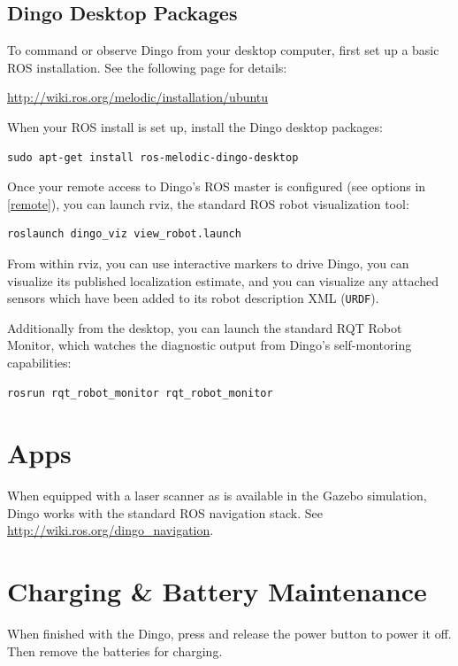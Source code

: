 \documentclass[]{clearpath-latex/clearpath-manual}
\begin{document}
\newpage\subsection{Dingo Desktop Packages}

To command or observe Dingo from your desktop computer, first set up a basic
ROS installation. See the following page for details:

\url{http://wiki.ros.org/melodic/installation/ubuntu}

When your ROS install is set up, install the Dingo desktop packages:

\begin{lstlisting}
sudo apt-get install ros-melodic-dingo-desktop
\end{lstlisting}

Once your remote access to Dingo's ROS master is configured (see options in \autoref{remote}),
you can launch rviz, the standard ROS robot visualization tool:

\begin{lstlisting}
roslaunch dingo_viz view_robot.launch
\end{lstlisting}

From within rviz, you can use interactive markers to drive Dingo, you can visualize its
published localization estimate, and you can visualize any attached sensors which have been
added to its robot description XML (\lstinline{URDF}).

Additionally from the desktop, you can launch the standard RQT Robot Monitor, which
watches the diagnostic output from Dingo's self-montoring capabilities:

\begin{lstlisting}
rosrun rqt_robot_monitor rqt_robot_monitor
\end{lstlisting}

\section{Apps}

When equipped with a laser scanner as is available in the Gazebo simulation, Dingo works with the
standard ROS navigation stack. See \url{http://wiki.ros.org/dingo_navigation}.


\section{Charging \& Battery Maintenance}

When finished with the Dingo, press and release the power button  to power it off. Then remove the batteries for charging.
\end{document}
